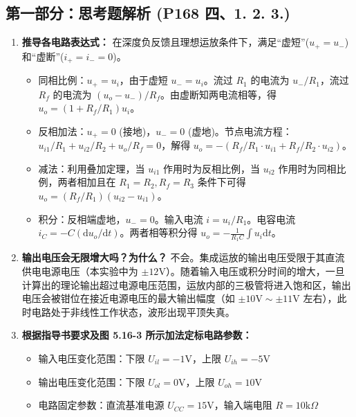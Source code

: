 ﻿\documentclass[10.5pt]{config}
\begin{document}
\subsection*{第一部分：思考题解析 (P168 四、1. 2. 3.)}
\begin{enumerate}[label=\arabic*., leftmargin=2em]
    \item \textbf{推导各电路表达式：}
    在深度负反馈且理想运放条件下，满足“虚短”($u_+ = u_-$)和“虚断”($i_+ = i_- = 0$)。
    \begin{itemize}
        \item 同相比例：$u_+ = u_i$，由于虚短 $u_- = u_i$。流过 $R_1$ 的电流为 $u_- / R_1$，流过 $R_f$ 的电流为 $(u_o - u_-) / R_f$。由虚断知两电流相等，得 $u_o = (1 + R_f/R_1)u_i$。
        \item 反相加法：$u_+ = 0$ (接地)，$u_- = 0$ (虚地)。节点电流方程：$u_{i1}/R_1 + u_{i2}/R_2 + u_o/R_f = 0$，解得 $u_o = -(R_f/R_1 \cdot u_{i1} + R_f/R_2 \cdot u_{i2})$。
        \item 减法：利用叠加定理，当 $u_{i1}$ 作用时为反相比例，当 $u_{i2}$ 作用时为同相比例，两者相加且在 $R_1=R_2, R_f=R_3$ 条件下可得 $u_o = (R_f/R_1)(u_{i2}-u_{i1})$。
        \item 积分：反相端虚地，$u_-=0$。输入电流 $i = u_i / R_1$。电容电流 $i_C = - C (\mathrm{d}u_o/\mathrm{d}t)$。两者相等积分得 $u_o = -\frac{1}{R_1 C} \int u_i \mathrm{d}t$。
    \end{itemize}
    \item \textbf{输出电压会无限增大吗？为什么？}
    不会。集成运放的输出电压受限于其直流供电电源电压（本实验中为 $\pm 12\mathrm{V}$）。随着输入电压或积分时间的增大，一旦计算出的理论输出超过电源电压范围，运放内部的三极管将进入饱和区，输出电压会被钳位在接近电源电压的最大输出幅度（如 $\pm 10\mathrm{V} \sim \pm 11\mathrm{V}$ 左右），此时电路处于非线性工作状态，波形出现平顶失真。

\item \textbf{根据指导书要求及图 5.16-3 所示加法定标电路参数：}



\begin{itemize}[leftmargin=2em]
    \item 输入电压变化范围：下限 $U_{il} = -1\mathrm{V}$，上限 $U_{ih} = -5\mathrm{V}$
    \item 输出电压变化范围：下限 $U_{ol} = 0\mathrm{V}$，上限 $U_{oh} = 10\mathrm{V}$
    \item 电路固定参数：直流基准电源 $U_{CC} = 15\mathrm{V}$，输入端电阻 $R = 10\mathrm{k}\Omega$
\end{itemize}



\end{enumerate}
\end{document}
